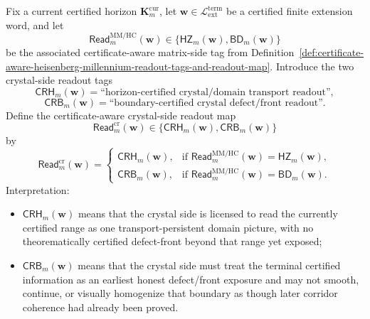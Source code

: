 \begin{definition}
\label{def:certificate-aware-crystal-readout-tags-and-crystal-side-readout-map}
Fix a current certified horizon \(\mathbf K_m^{\mathrm{cur}}\), let \(\mathbf w\in \mathcal L_{\mathrm{ext}}^{\mathrm{term}}\) be a certified finite extension word, and let
\[
 \mathsf{Read}^{\mathrm{MM/HC}}_{m}(\mathbf w)
 \in
 \{\mathsf{HZ}_{m}(\mathbf w),\mathsf{BD}_{m}(\mathbf w)\}
\]
be the associated certificate-aware matrix-side tag from Definition~\ref{def:certificate-aware-heisenberg-millennium-readout-tags-and-readout-map}. Introduce the two crystal-side readout tags
\[
 \mathsf{CRH}_{m}(\mathbf w)=\text{``horizon-certified crystal/domain transport readout''},
\]
\[
 \mathsf{CRB}_{m}(\mathbf w)=\text{``boundary-certified crystal defect/front readout''}.
\]
Define the certificate-aware crystal-side readout map
\[
 \mathsf{Read}^{\mathrm{cr}}_{m}(\mathbf w)
 \in
 \{\mathsf{CRH}_{m}(\mathbf w),\mathsf{CRB}_{m}(\mathbf w)\}
\]
by
\[
 \mathsf{Read}^{\mathrm{cr}}_{m}(\mathbf w)
 =
 \begin{cases}
 \mathsf{CRH}_{m}(\mathbf w), & \text{if }\mathsf{Read}^{\mathrm{MM/HC}}_{m}(\mathbf w)=\mathsf{HZ}_{m}(\mathbf w),\\[2mm]
 \mathsf{CRB}_{m}(\mathbf w), & \text{if }\mathsf{Read}^{\mathrm{MM/HC}}_{m}(\mathbf w)=\mathsf{BD}_{m}(\mathbf w).
 \end{cases}
\]
Interpretation:
\begin{itemize}[leftmargin=2em]
 \item \(\mathsf{CRH}_{m}(\mathbf w)\) means that the crystal side is licensed to read the currently certified range as one transport-persistent domain picture, with no theorematically certified defect-front beyond that range yet exposed;
 \item \(\mathsf{CRB}_{m}(\mathbf w)\) means that the crystal side must treat the terminal certified information as an earliest honest defect/front exposure and may not smooth, continue, or visually homogenize that boundary as though later corridor coherence had already been proved.
\end{itemize}
\end{definition}

